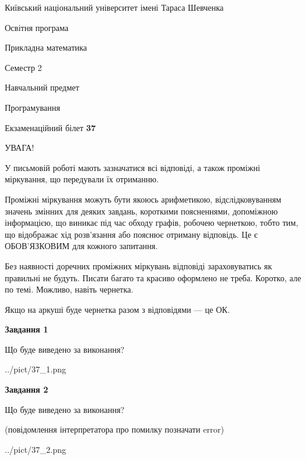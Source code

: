 \documentclass[12pt, ukrainian]{article}
\begin{document}
{{\begin {small}\par
{ \center  Київський національний університет імені Тараса Шевченка \par}
{\parbox {5 cm}{Освітня програма \hfill}{\parbox {7 cm}{Прикладна математика\hfill}}\parbox {6 cm}{\hfill Семестр 2}}\par
{\parbox {5 cm} {Навчальний предмет \hfill}\parbox {7 cm}{Програмування \hfill}\parbox {6cm}{\hfill}\par}\vspace{-7pt} \end{small}}{\center Екзаменаційний білет \No \textbf
{ 37 }\par}}
{
\begin {large}
УВАГА!

У письмовій роботі мають зазначатися всі відповіді, а також проміжні міркування, що передували їх отриманню.

Проміжні міркування можуть бути якоюсь арифметикою, відслідковуванням зна\-чень змінних для деяких завдань,
короткими поясненнями, допоміжною інформацією, що виникає під час обходу графів, робочею чернеткою,
тобто тим, що відображає хід розв’язання або пояснює отриману відповідь.
Це є ОБОВ’ЯЗКОВИМ для кожного запитання.

Без наявності доречних проміжних міркувань відповіді зараховуватись як правиль\-ні не будуть.
Писати багато та красиво оформлено не треба. Коротко, але по темі. Можли\-во, навіть чернетка.

Якщо на аркуші буде чернетка разом з відповідями --- це ОК.

\newpage

{\begin {center}\textbf{Завдання 1}\end {center}}\par
Що буде виведено за виконання?\par
\begin{center}
	{../pict/37_1.png}
\end{center}
\newpage

{\begin {center}\textbf{Завдання 2}\end {center}}\par
Що буде виведено за виконання?\par
 (повідомлення інтерпретатора про помилку позначати error)\par
\begin{center}
	{../pict/37_2.png}
\end{center}
\newpage


\end{large}}
\end{document}
